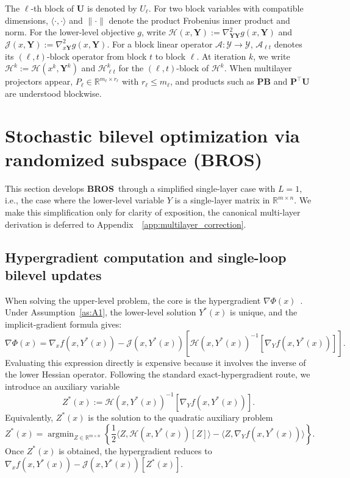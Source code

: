 \documentclass{pkumelon}
\theoremstyle{plain}
\DeclareMathOperator{\argmin}{argmin}
\newcommand{\Phiobj}{\Phi}
\newcommand{\oursname}{\textnormal{\textbf{BROS}}}
\newcommand{\ours}{\oursname\ }
\newcommand{\ourslast}{\oursname}
\begin{document}
The $\ell$-th block of $\boldsymbol U$ is denoted by $U_\ell$. For two block variables with compatible dimensions, $\langle\cdot,\cdot\rangle$ and $\|\cdot\|$ denote the product Frobenius inner product and norm. For the lower-level objective $g$, write $\mathcal H(x,\boldsymbol Y):=\nabla^2_{\boldsymbol Y\boldsymbol Y}g(x,\boldsymbol Y)$ and $\mathcal J(x,\boldsymbol Y):=\nabla^2_{x\boldsymbol Y}g(x,\boldsymbol Y)$. For a block linear operator $\mathcal A:\mathcal Y\to\mathcal Y$, $\mathcal A_{\ell t}$ denotes its $(\ell,t)$-block operator from block $t$ to block $\ell$. At iteration $k$, we write $\mathcal H^k:=\mathcal H(x^k,\boldsymbol Y^k)$ and $\mathcal H_{\ell t}^k$ for the $(\ell,t)$-block of $\mathcal H^k$. When multilayer projectors appear, $P_\ell\in\mathbb R^{m_\ell\times r_\ell}$ with $r_\ell\le m_\ell$, and products such as $\boldsymbol P\boldsymbol B$ and $\boldsymbol P^\top\boldsymbol U$ are understood blockwise.

\section{Stochastic bilevel optimization via randomized subspace (\ourslast)}
\label{sec:algorithm}

This section develops \ours through a simplified single-layer case with $L=1$, i.e., the case where the lower-level variable $Y$ is a single-layer matrix in $\mathbb R^{m\times n}$. We make this simplification only for clarity of exposition, the canonical multi-layer derivation is deferred to Appendix~~\ref{app:multilayer_correction}.

\subsection{Hypergradient computation and single-loop bilevel updates}
\label{subsec:target_single}

When solving the upper-level problem, the core is the hypergradient $\nabla\Phiobj(x)$~\citep{ghadimi2018approximation}. Under Assumption~\ref{as:A1}, the lower-level solution $Y^*(x)$ is unique, and the implicit-gradient formula gives:
\begin{equation}
\label{eq:hypergrad}
\nabla\Phiobj(x)=\nabla_x f(x,Y^*(x))-\mathcal J(x,Y^*(x))\!\left[\mathcal H(x,Y^*(x))^{-1}[\nabla_Y f(x,Y^*(x))]\right].
\end{equation}
Evaluating this expression directly is expensive because it involves the inverse of the lower Hessian operator. Following the standard exact-hypergradient route, we introduce an auxiliary variable
\begin{equation*}
Z^*(x):=\mathcal H(x,Y^*(x))^{-1}[\nabla_Y f(x,Y^*(x))].
\end{equation*}
Equivalently, $Z^*(x)$ is the solution to the quadratic auxiliary problem
\begin{equation}
\label{eq:auxiliary_quadratic_single}
Z^*(x)=\argmin_{Z\in\mathbb R^{m\times n}}\left\{\frac{1}{2}\langle Z,\mathcal H(x,Y^*(x))[Z]\rangle-\langle Z,\nabla_Y f(x,Y^*(x))\rangle\right\}.
\end{equation}
Once $Z^*(x)$ is obtained, the hypergradient reduces to $\nabla_x f(x,Y^*(x))-\mathcal J(x,Y^*(x))[Z^*(x)]$.
\end{document}
